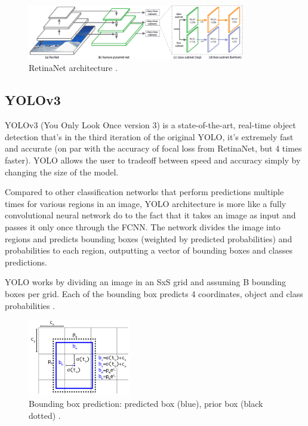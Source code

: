    
    \begin{figure}[H]
        \centering
        \captionsetup{justification=centering}
        \includegraphics[width=0.85\textwidth]{Sections/2StateOfTheArt/2_images/RetinaNet.png}
        \caption[RetinaNet architecture]{RetinaNet architecture \cite{Lin2017}.} 
        \label{fig:retinanet}
    \end{figure}


    \subsection{YOLOv3}

    YOLOv3 (You Only Look Once version 3) is a state-of-the-art, real-time object detection that’s in the third iteration of the original YOLO, it’s extremely fast and accurate (on par with the accuracy of focal loss from RetinaNet, but 4 times faster). YOLO allows the user to tradeoff between speed and accuracy simply by changing the size of the model.\par

    Compared to other classification networks that perform predictions multiple times for various regions in an image, YOLO architecture is more like a fully convolutional neural network do to the fact that it takes an image as input and passes it only once through the FCNN. The network divides the image into regions and predicts bounding boxes (weighted by predicted probabilities) and probabilities to each region, outputting a vector of bounding boxes and classes predictions. \par 
    
    \par YOLO works by dividing an image in an SxS grid and assuming B bounding boxes per grid. Each of the bounding box predicts 4 coordinates, object and class probabilities \cite{Agarwal2019}.

    \begin{figure}[H]
        \centering
        \captionsetup{justification=centering}
        \includegraphics[width=0.4\textwidth]{Sections/2StateOfTheArt/2_images/yolo_boundingbox.png}
        \caption[YOLOv3 bounding box prediction]{Bounding box prediction: predicted box (blue), prior box (black dotted) \cite{Redmon2018}.} 
    \end{figure}

